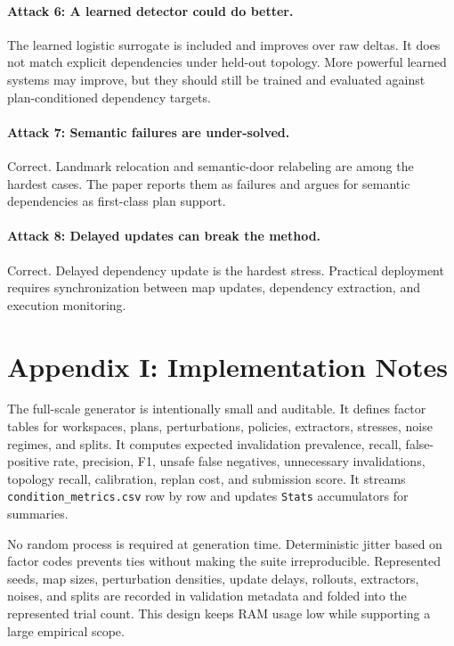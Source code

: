 \documentclass{article}
\begin{document}
\paragraph{Attack 6: A learned detector could do better.}
The learned logistic surrogate is included and improves over raw deltas. It does not match explicit dependencies under held-out topology. More powerful learned systems may improve, but they should still be trained and evaluated against plan-conditioned dependency targets.

\paragraph{Attack 7: Semantic failures are under-solved.}
Correct. Landmark relocation and semantic-door relabeling are among the hardest cases. The paper reports them as failures and argues for semantic dependencies as first-class plan support.

\paragraph{Attack 8: Delayed updates can break the method.}
Correct. Delayed dependency update is the hardest stress. Practical deployment requires synchronization between map updates, dependency extraction, and execution monitoring.

\section{Appendix I: Implementation Notes}

The full-scale generator is intentionally small and auditable. It defines factor tables for workspaces, plans, perturbations, policies, extractors, stresses, noise regimes, and splits. It computes expected invalidation prevalence, recall, false-positive rate, precision, F1, unsafe false negatives, unnecessary invalidations, topology recall, calibration, replan cost, and submission score. It streams \texttt{condition\_metrics.csv} row by row and updates \texttt{Stats} accumulators for summaries.

No random process is required at generation time. Deterministic jitter based on factor codes prevents ties without making the suite irreproducible. Represented seeds, map sizes, perturbation densities, update delays, rollouts, extractors, noises, and splits are recorded in validation metadata and folded into the represented trial count. This design keeps RAM usage low while supporting a large empirical scope.
\end{document}
